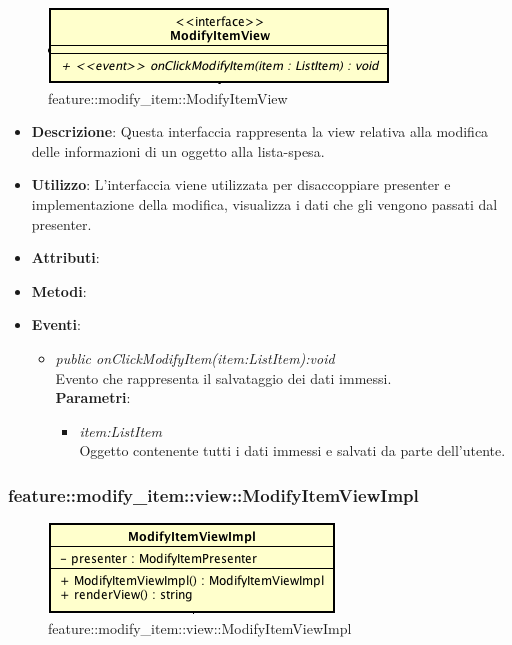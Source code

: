 \label{feature::modify_item::ModifyItemView}
\begin{figure}[ht]
	\centering
	\includegraphics[scale=0.5]{Sezioni/SottosezioniST/img/app/ModifyItemView.png}
	\caption{feature::modify\_item::ModifyItemView}
\end{figure}

\begin{itemize}
\item \textbf{Descrizione}: Questa interfaccia rappresenta la view relativa alla modifica delle informazioni di un oggetto alla lista-spesa.
\item \textbf{Utilizzo}: L'interfaccia viene utilizzata per disaccoppiare presenter e implementazione della modifica, visualizza i dati che gli vengono passati dal presenter.
\item \textbf{Attributi}: 
\item \textbf{Metodi}:
\item \textbf{Eventi}:
	\begin{itemize}
	\item \textit{public onClickModifyItem(item:ListItem):void}\\
	Evento che rappresenta il salvataggio dei dati immessi.
			\\ \textbf{Parametri}: \begin{itemize}
			\item \textit{item:ListItem}\\
			Oggetto contenente tutti i dati immessi e salvati da parte dell'utente.
			\end{itemize} 
	\end{itemize}
\end{itemize}

\subsubsection{feature::modify\_item::view::ModifyItemViewImpl}

\label{feature::modify_item::view::ModifyItemViewImpl}
\begin{figure}[ht]
	\centering
	\includegraphics[scale=0.5]{Sezioni/SottosezioniST/img/app/ModifyItemViewImpl.png}
	\caption{feature::modify\_item::view::ModifyItemViewImpl}
\end{figure}

